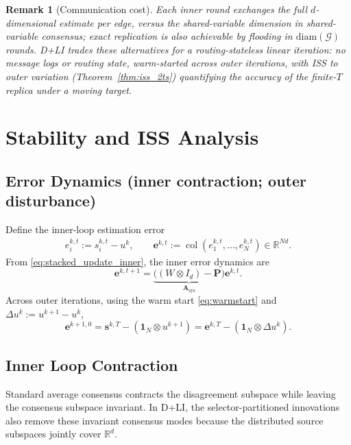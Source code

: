 \documentclass[letterpaper, 10 pt, conference]{ieeeconf} %
\newtheorem{remark}{Remark}
\DeclareMathOperator{\col}{col}
\begin{document}
\begin{remark}[Communication cost]\label{rem:comm_cost}
Each inner round exchanges the full $d$-dimensional estimate per edge, versus the shared-variable dimension in shared-variable consensus; exact replication is also achievable by flooding in $\mathrm{diam}(\mathcal G)$ rounds. D+LI trades these alternatives for a routing-stateless linear iteration: no message logs or routing state, warm-started across outer iterations, with ISS to outer variation (Theorem~\ref{thm:iss_2ts}) quantifying the accuracy of the finite-$T$ replica under a moving target.
\end{remark}

\section{Stability and ISS Analysis}\label{sec:Stability_ISS}

\subsection{Error Dynamics (inner contraction; outer disturbance)}
Define the inner-loop estimation error
\begin{align}
e_i^{k,t}:=s_i^{k,t}-u^{k},\qquad
\mathbf{e}^{k,t}:=\col(e_1^{k,t},\dots,e_N^{k,t})\in\mathbb{R}^{Nd}.
\end{align}
From \eqref{eq:stacked_update_inner}, the inner error dynamics are
\begin{equation}\label{eq:error_dynamics_inner}
\mathbf{e}^{k,t+1}=\underbrace{\Big((W\otimes I_d)-\mathbf{P}\Big)}_{\mathbf{A}_{\mathrm{sys}}}\mathbf{e}^{k,t}.
\end{equation}
Across outer iterations, using the warm start \eqref{eq:warmstart} and $\Delta u^{k}:=u^{k+1}-u^{k}$,
\begin{equation}\label{eq:error_outer}
\mathbf{e}^{k+1,0}=\mathbf{s}^{k,T}-(\mathbf{1}_N\otimes u^{k+1})
=\mathbf{e}^{k,T}-(\mathbf{1}_N\otimes \Delta u^{k}).
\end{equation}

\subsection{Inner Loop Contraction}
Standard average consensus contracts the disagreement subspace while leaving the consensus subspace invariant. In D+LI, the selector-partitioned innovations also remove these invariant consensus modes because the distributed source subspaces jointly cover \(\mathbb R^d\).
\end{document}

